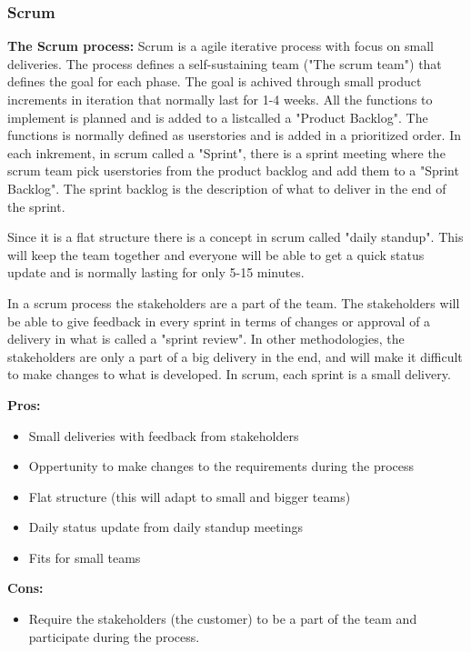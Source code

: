 \subsubsection{Scrum}
{\bf The Scrum process: } Scrum is a agile iterative process with focus on small deliveries. The process
defines a self-sustaining team ("The scrum team") that defines the goal for each phase. The goal 
is achived through small product increments in iteration that normally last for 1-4 weeks. 
All the functions to implement is planned and is added to a listcalled a "Product Backlog". The
functions is normally defined as userstories and is added in a prioritized order. In each inkrement, 
in scrum called a "Sprint", there is a sprint meeting where the scrum team pick userstories from the 
product backlog and add them to a "Sprint Backlog". The sprint backlog is the description of what 
to deliver in the end of the sprint.

Since it is a flat structure there is a concept in scrum called "daily standup". This will keep
the team together and everyone will be able to get a quick status update and is normally lasting
for only 5-15 minutes. 

In a scrum process the stakeholders are a part of the team. The stakeholders will be able to give
feedback in every sprint in terms of changes or approval of a delivery in what is called a "sprint review".
In other methodologies, the stakeholders are only a part of a big delivery in the end, and will 
make it difficult to make changes to what is developed. In scrum, each sprint is a small delivery.

{\bf Pros: }
\begin{itemize}
	\item Small deliveries with feedback from stakeholders
	\item Oppertunity to make changes to the requirements during the process
	\item Flat structure (this will adapt to small and bigger teams)
	\item Daily status update from daily standup meetings
	\item Fits for small teams
\end{itemize}

{\bf Cons: }
\begin{itemize}
	\item Require the stakeholders (the customer) to be a part of the team and participate during the process.
\end{itemize}

